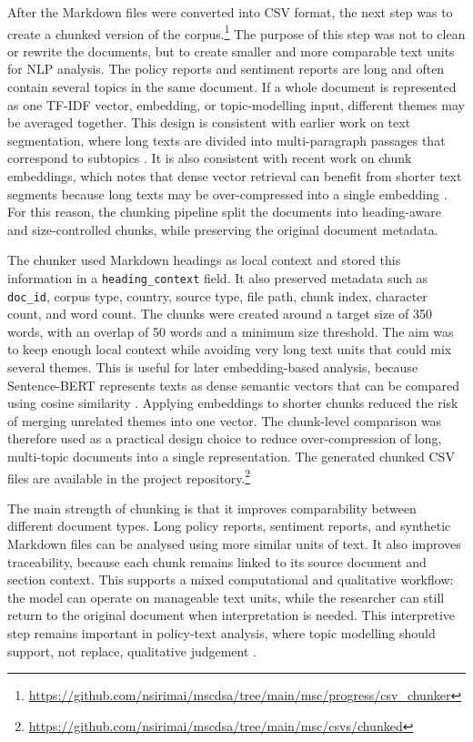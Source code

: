 \documentclass{article}
\begin{document}
After the Markdown files were converted into CSV format, the next step was to create
a chunked version of the
corpus.\footnote{\url{https://github.com/nsirimai/mscdsa/tree/main/msc/progress/csv_chunker}}
The purpose of this step was not to clean or rewrite the documents, but to create
smaller and more comparable text units for NLP analysis. The policy reports and
sentiment reports are long and often contain several topics in the same document. If
a whole document is represented as one TF-IDF vector, embedding, or topic-modelling
input, different themes may be averaged together. This design is consistent with
earlier work on text segmentation, where long texts are divided into multi-paragraph
passages that correspond to subtopics \cite{hearst1997texttiling}. It is also
consistent with recent work on chunk embeddings, which notes that dense vector
retrieval can benefit from shorter text segments because long texts may be
over-compressed into a single embedding
\cite{gunther2024latechunking,duarte2024lumberchunker}. For this reason, the chunking
pipeline split the documents into heading-aware and size-controlled chunks, while
preserving the original document metadata. 

The chunker used Markdown headings as local context and stored this information in a
\texttt{heading\_context} field. It also preserved metadata such as \texttt{doc\_id},
corpus type, country, source type, file path, chunk index, character count, and word
count. The chunks were created around a target size of 350 words, with an overlap of
50 words and a minimum size threshold. The aim was to keep enough local context while
avoiding very long text units that could mix several themes. This is useful for later
embedding-based analysis, because Sentence-BERT represents texts as dense semantic
vectors that can be compared using cosine similarity \cite{reimers2019sentence}.
Applying embeddings to shorter chunks reduced the risk of merging unrelated themes
into one vector. The chunk-level comparison was therefore used as a practical design
choice to reduce over-compression of long, multi-topic documents into a single
representation. The generated chunked CSV files are available in the project
repository.\footnote{\url{https://github.com/nsirimai/mscdsa/tree/main/msc/csvs/chunked}}



The main strength of chunking is that it improves comparability between different
document types. Long policy reports, sentiment reports, and synthetic Markdown files
can be analysed using more similar units of text. It also improves traceability,
because each chunk remains linked to its source document and section context. This
supports a mixed computational and qualitative workflow: the model can operate on
manageable text units, while the researcher can still return to the original document
when interpretation is needed. This interpretive step remains important in
policy-text analysis, where topic modelling should support, not replace, qualitative
judgement \cite{isoaho2021topic}.
\end{document}
